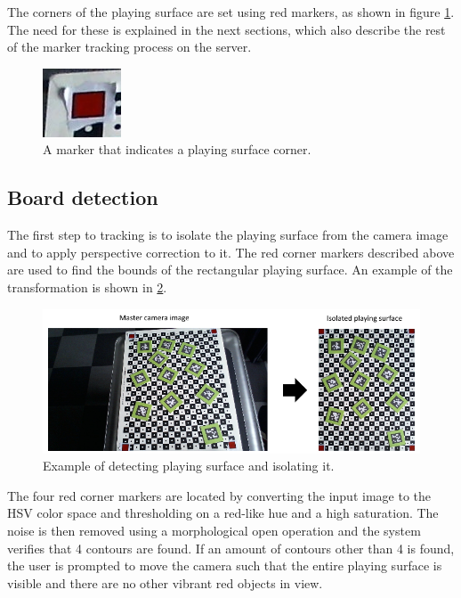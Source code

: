         The corners of the playing surface are set using red markers, as shown
        in figure \ref{fig:cornermarkers}. The need for these is explained in
        the next sections, which also describe the rest of the marker tracking
        process on the server.

        \begin{figure}[!ht]
            \centering
            \includegraphics{CornerMarker}
            \caption{A marker that indicates a playing surface corner.}
            \label{fig:cornermarkers}
        \end{figure}

        \subsection{Board detection}
            The first step to tracking is to isolate the playing surface from
            the camera image and to apply perspective correction to it. The red
            corner markers described above are used to find the bounds of the
            rectangular playing surface. An example of the transformation is
            shown in \ref{fig:boarddetection}.

            \begin{figure}[!ht]
                \centering
                \includegraphics[width=\textwidth]{BoardDetection}
                \caption{Example of detecting playing surface and isolating it.}
                \label{fig:boarddetection}
            \end{figure}

            The four red corner markers are located by converting the input
            image to the HSV color space and thresholding on a red-like hue and
            a high saturation. The noise is then removed using a morphological
            open operation and the system verifies that 4 contours are found. If
            an amount of contours other than 4 is found, the user is prompted to
            move the camera such that the entire playing surface is visible and
            there are no other vibrant red objects in view.

